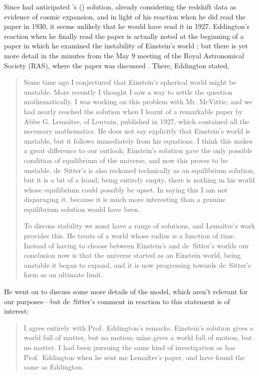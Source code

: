 \documentclass[12 pt]{article}
\def\citeapos#1{\citeauthor{#1}'s (\citeyear{#1})}
\begin{document}
Since \citet{Eddington1923} had anticipated \citeapos{Lemaitre1927} solution, already considering the redshift data as evidence of cosmic expansion, and in light of his reaction when he did read the paper in 1930, it seems unlikely that he would have read it in 1927. Eddington's reaction when he finally read the paper is actually noted at the beginning of a paper in which he examined the instability of Einstein's world \citep{Eddington1930}; but there is yet more detail in the minutes from the May 9 meeting of the Royal Astronomical Society (RAS), where the paper was discussed \citep{RAS1930}. There, Eddington stated,
\begin{quotation}
Some time ago I conjectured that Einstein's spherical world might be unstable. More recently I thought I saw a way to settle the question mathematically. I was working on this problem with Mr. McVittie, and we had nearly reached the solution when I learnt of a remarkable paper by Abbe G. Lema\^{i}tre, of Louvain, published in 1927, which contained all the necessary mathematics. He does not say explicitly that Einstein's world is unstable, but it follows immediately from his equations. I think this makes a great difference to our outlook; Einstein's solution gave the only possible condition of equilibrium of the universe, and now this proves to be unstable. de~Sitter's is also reckoned technically as an equilibrium solution, but it is a bit of a fraud; being entirely empty, there is nothing in his world whose equilibrium could possibly be upset. In saying this I am not disparaging it, because it is much more interesting than a genuine equilibrium solution would have been.

To discuss stability we must have a range of solutions, and Lema\^{i}tre's work provides this. He treats of a world whose radius is a function of time. Instead of having to choose between Einstein's and de~Sitter's worlds our conclusion now is that the universe started as an Einstein world, being unstable it began to expand, and it is now progressing towards de~Sitter's form as an ultimate limit.
\end{quotation}
He went on to discuss some more details of the model, which aren't relevant for our purposes---but de~Sitter's comment in reaction to this statement is of interest:
\begin{quotation}
I agree entirely with Prof.\ Eddington's remarks. Einstein's solution gives a world full of matter, but no motion; mine gives a world full of motion, but no matter. I had been pursuing the same kind of investigation as has Prof.\ Eddington when he sent me Lema\^{i}tre's paper, and have found the same as Eddington.
\end{quotation}
\end{document}
